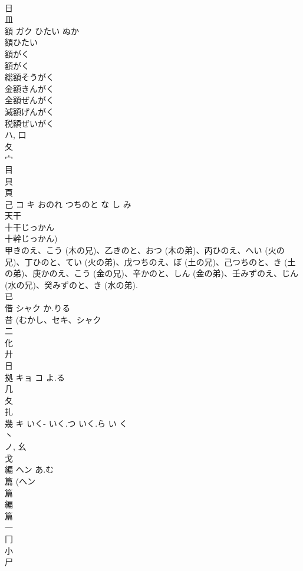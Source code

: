 \documentclass[8pt]{extreport}
\begin{document}
\begin{CJK}{UTF8}{min}
\\	日 
\\	皿 
\\	額	ガク	ひたい ぬか	
\\	額ひたい
\\	額がく
\\	額がく
\\	総額そうがく
\\	金額きんがく
\\	全額ぜんがく
\\	減額げんがく
\\	税額ぜいがく
\\	ハ, 口 
\\	夂 
\\	宀 
\\	目 
\\	貝 
\\	頁 
\\	己	コ キ	おのれ つちのと な し み	
\\	天干 
\\	十干じっかん 
\\	十幹じっかん) 
\\	甲きのえ、こう (木の兄)、乙きのと、おつ (木の弟)、丙ひのえ、へい (火の兄)、丁ひのと、てい (火の弟)、戊つちのえ、ぼ (土の兄)、己つちのと、き (土の弟)、庚かのえ、こう (金の兄)、辛かのと、しん (金の弟)、壬みずのえ、じん (水の兄)、癸みずのと、き (水の弟). 
\\	已 
\\	借	シャク	か.りる	
\\	昔 (むかし、セキ、シャク 
\\	二 
\\	化 
\\	廾 
\\	日 
\\	拠	キョ コ	よ.る	
\\	几 
\\	夂 
\\	扎	
\\	幾	キ	いく- いく.つ いく.ら い く	
\\	丶 
\\	ノ, 幺 
\\	戈 
\\	編	ヘン	あ.む	
\\	篇 (ヘン 
\\	篇 
\\	編 
\\	篇 
\\	一 
\\	冂 
\\	小 
\\	尸 

\end{CJK}
\end{document}
